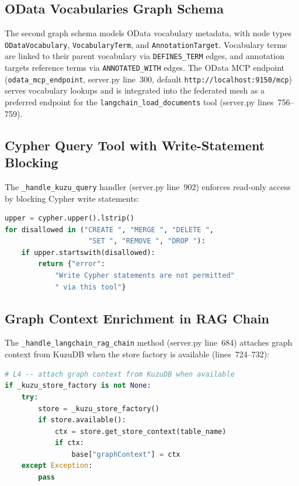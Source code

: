 \documentclass[11pt]{article}
\newcommand{\code}[1]{\texttt{#1}}
\begin{document}
\subsection{OData Vocabularies Graph Schema}

The second graph schema models OData vocabulary metadata, with node
types \code{ODataVocabulary}, \code{VocabularyTerm}, and
\code{AnnotationTarget}.  Vocabulary terms are linked to their parent
vocabulary via \code{DEFINES\_TERM} edges, and annotation targets
reference terms via \code{ANNOTATED\_WITH} edges.  The OData MCP
endpoint (\code{odata\_mcp\_endpoint}, server.py line~300, default
\code{http://localhost:9150/mcp}) serves vocabulary lookups and is
integrated into the federated mesh as a preferred endpoint for the
\code{langchain\_load\_documents} tool (server.py lines~756--759).

\subsection{Cypher Query Tool with Write-Statement Blocking}

The \code{\_handle\_kuzu\_query} handler (server.py line~902) enforces
read-only access by blocking Cypher write statements:

\begin{lstlisting}[language=Python,caption={Write-statement blocking (server.py lines 906--909)},label=lst:cypher-block]
upper = cypher.upper().lstrip()
for disallowed in ("CREATE ", "MERGE ", "DELETE ",
                    "SET ", "REMOVE ", "DROP "):
    if upper.startswith(disallowed):
        return {"error":
            "Write Cypher statements are not permitted"
            " via this tool"}
\end{lstlisting}

\subsection{Graph Context Enrichment in RAG Chain}

The \code{\_handle\_langchain\_rag\_chain} method (server.py line~684) attaches
graph context from KuzuDB when the store factory is available
(lines~724--732):

\begin{lstlisting}[language=Python,caption={Graph context enrichment (server.py lines 723--732)},label=lst:graph-enrich]
# L4 -- attach graph context from KuzuDB when available
if _kuzu_store_factory is not None:
    try:
        store = _kuzu_store_factory()
        if store.available():
            ctx = store.get_store_context(table_name)
            if ctx:
                base["graphContext"] = ctx
    except Exception:
        pass
\end{lstlisting}
\end{document}

